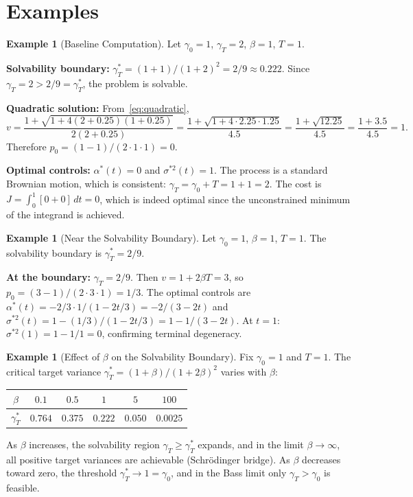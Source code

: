 \documentclass[12pt]{article}
\theoremstyle{definition}
\newtheorem{example}[theorem]{Example}
\begin{document}
\section{Examples}\label{sec:examples}

\begin{example}[Baseline Computation]\label{ex:baseline}
Let $\gamma_0 = 1$, $\gamma_T = 2$, $\beta = 1$, $T = 1$.

\medskip\noindent
\textbf{Solvability boundary:}
$\gamma_T^* = (1 + 1)/(1 + 2)^2 = 2/9 \approx 0.222$.
Since $\gamma_T = 2 > 2/9 = \gamma_T^*$, the problem is solvable.

\medskip\noindent
\textbf{Quadratic solution:}
From~\eqref{eq:quadratic},
\[
v = \frac{1 + \sqrt{1 + 4(2 + 0.25)(1 + 0.25)}}{2(2 + 0.25)}
  = \frac{1 + \sqrt{1 + 4 \cdot 2.25 \cdot 1.25}}{4.5}
  = \frac{1 + \sqrt{12.25}}{4.5}
  = \frac{1 + 3.5}{4.5} = 1.
\]
Therefore $p_0 = (1 - 1)/(2 \cdot 1 \cdot 1) = 0$.

\medskip\noindent
\textbf{Optimal controls:}
$\alpha^*(t) = 0$ and $\sigma^{*2}(t) = 1$.
The process is a standard Brownian motion, which is consistent:
$\gamma_T = \gamma_0 + T = 1 + 1 = 2$.
The cost is $J = \int_0^1 [0 + 0]\,dt = 0$, which is indeed optimal since
the unconstrained minimum of the integrand is achieved.
\end{example}

\begin{example}[Near the Solvability Boundary]\label{ex:boundary}
Let $\gamma_0 = 1$, $\beta = 1$, $T = 1$.
The solvability boundary is $\gamma_T^* = 2/9$.

\medskip\noindent
\textbf{At the boundary:} $\gamma_T = 2/9$.
Then $v = 1 + 2\beta T = 3$, so $p_0 = (3-1)/(2 \cdot 3 \cdot 1) = 1/3$.
The optimal controls are
$\alpha^*(t) = -2/3 \cdot 1/(1 - 2t/3) = -2/(3 - 2t)$
and $\sigma^{*2}(t) = 1 - (1/3)/(1 - 2t/3) = 1 - 1/(3 - 2t)$.
At $t = 1$: $\sigma^{*2}(1) = 1 - 1/1 = 0$, confirming terminal degeneracy.
\end{example}

\begin{example}[Effect of $\beta$ on the Solvability Boundary]
\label{ex:beta-effect}
Fix $\gamma_0 = 1$ and $T = 1$.
The critical target variance $\gamma_T^* = (1 + \beta)/(1 + 2\beta)^2$
varies with $\beta$:

\begin{center}
\begin{tabular}{c|ccccc}
$\beta$ & $0.1$ & $0.5$ & $1$ & $5$ & $100$ \\
\hline
$\gamma_T^*$ & $0.764$ & $0.375$ & $0.222$ & $0.050$ & $0.0025$
\end{tabular}
\end{center}

\noindent
As $\beta$ increases, the solvability region
$\gamma_T \ge \gamma_T^*$ expands, and in the limit
$\beta \to \infty$, all positive target variances are achievable
(Schr\"odinger bridge).
As $\beta$ decreases toward zero, the threshold $\gamma_T^* \to 1 = \gamma_0$,
and in the Bass limit only $\gamma_T > \gamma_0$ is feasible.
\end{example}
\end{document}
